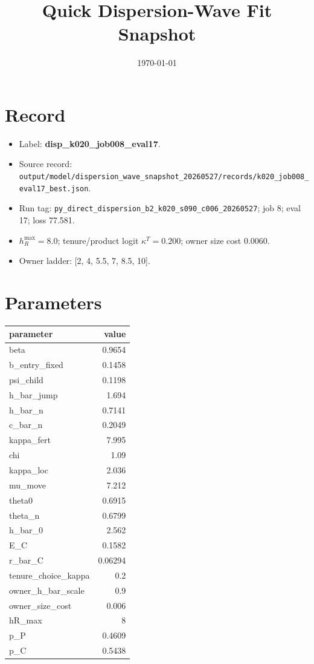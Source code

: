 \documentclass[11pt]{article}
\title{Quick Dispersion-Wave Fit Snapshot}
\date{\today}
\begin{document}
\maketitle
\section*{Record}
\begin{itemize}
\item Label: \textbf{disp\_k020\_job008\_eval17}.
\item Source record: \texttt{output/model/dispersion\_wave\_snapshot\_20260527/records/k020\_job008\_eval17\_best.json}.
\item Run tag: \texttt{py\_direct\_dispersion\_b2\_k020\_s090\_c006\_20260527}; job 8; eval 17; loss 77.581.
\item $h_R^{\max}=8.0$; tenure/product logit $\kappa^T=0.200$; owner size cost 0.0060.
\item Owner ladder: [2, 4, 5.5, 7, 8.5, 10].
\end{itemize}
\section*{Parameters}
\begin{table}[H]\centering\scriptsize
\begin{tabular}{lr}
\toprule
parameter & value \\
\midrule
beta & 0.9654 \\
b\_entry\_fixed & 0.1458 \\
psi\_child & 0.1198 \\
h\_bar\_jump & 1.694 \\
h\_bar\_n & 0.7141 \\
c\_bar\_n & 0.2049 \\
kappa\_fert & 7.995 \\
chi & 1.09 \\
kappa\_loc & 2.036 \\
mu\_move & 7.212 \\
theta0 & 0.6915 \\
theta\_n & 0.6799 \\
h\_bar\_0 & 2.562 \\
E\_C & 0.1582 \\
r\_bar\_C & 0.06294 \\
tenure\_choice\_kappa & 0.2 \\
owner\_h\_bar\_scale & 0.9 \\
owner\_size\_cost & 0.006 \\
hR\_max & 8 \\
p\_P & 0.4609 \\
p\_C & 0.5438 \\
\bottomrule
\end{tabular}
\end{table}
\end{document}
